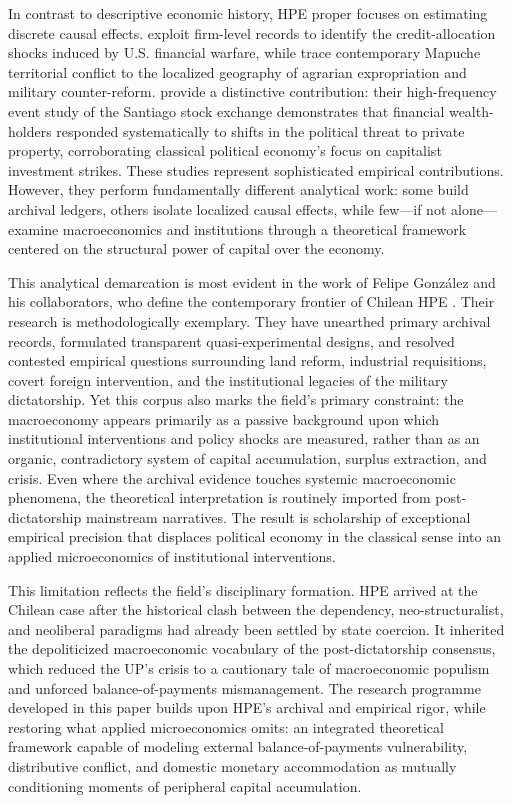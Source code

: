 In contrast to descriptive economic history, HPE proper focuses on estimating discrete causal 
effects. \citet{AldunateGonzalezPrem2024} exploit firm-level records to identify the credit-allocation 
shocks induced by U.S. financial warfare, while \citet{JaimovichToledo2021} trace contemporary Mapuche territorial 
conflict to the localized geography of agrarian expropriation and military counter-reform. \citet{GirardiBowles2018} 
provide a distinctive contribution: their high-frequency event study of the Santiago stock exchange demonstrates 
that financial wealth-holders responded systematically to shifts in the political threat to private property, 
corroborating classical political economy's focus on capitalist investment strikes. These studies represent 
sophisticated empirical contributions. However, they perform fundamentally different analytical work: some 
build archival ledgers, others isolate localized causal effects, while few---if not \citet{GirardiBowles2018} 
alone---examine macroeconomics and institutions through a theoretical framework centered on the structural 
power of capital over the economy.

This analytical demarcation is most evident in the work of Felipe González and his collaborators, 
who define the contemporary frontier of Chilean HPE \citep{Gonzalez2013,GonzalezVial2021,AldunateGonzalezPrem2024,GonzalezPremUrzua2020,BautistaEtAl2023,GonzalezPrem2026Nat,GonzalezPrem2026Trans}. 
Their research is methodologically exemplary. They have unearthed primary archival records, formulated transparent 
quasi-experimental designs, and resolved contested empirical questions surrounding land reform, industrial 
requisitions, covert foreign intervention, and the institutional legacies of the military dictatorship. Yet this 
corpus also marks the field's primary constraint: the macroeconomy appears primarily as a passive background 
upon which institutional interventions and policy shocks are measured, rather than as an organic, contradictory 
system of capital accumulation, surplus extraction, and crisis. Even where the archival evidence touches systemic 
macroeconomic phenomena, the theoretical interpretation is routinely imported from post-dictatorship mainstream 
narratives. The result is scholarship of exceptional empirical precision that displaces political economy in the 
classical sense into an applied microeconomics of institutional interventions.

This limitation reflects the field's disciplinary formation. HPE arrived at the Chilean case after 
the historical clash between the dependency, neo-structuralist, and neoliberal paradigms had already been settled 
by state coercion. It inherited the depoliticized macroeconomic vocabulary of the 
post-dictatorship consensus, which reduced the UP's crisis to a cautionary tale of macroeconomic populism and 
unforced balance-of-payments mismanagement. The research programme developed in this paper builds upon HPE's 
archival and empirical rigor, while restoring what applied microeconomics omits: an integrated theoretical framework  capable of modeling external balance-of-payments vulnerability, distributive conflict, and domestic monetary  accommodation as mutually conditioning moments of peripheral capital accumulation.

